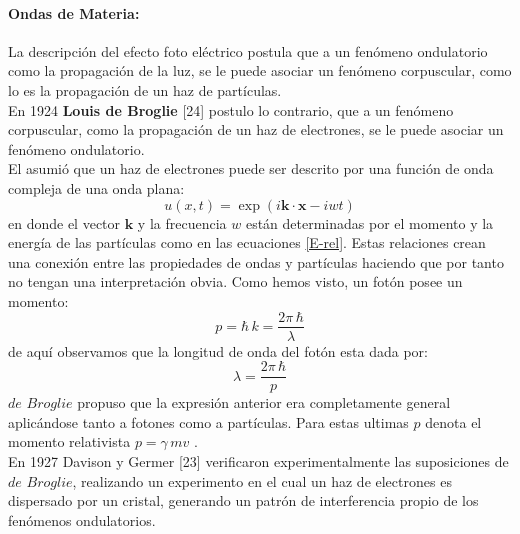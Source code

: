 \documentclass[12pt]{book}
\numberwithin{equation}{chapter}
\def\x{\mathbf{x}}
\def\k{\mathbf{k}}
\begin{document}
\paragraph{Ondas de Materia:}
La descripci\'on del efecto foto el\'ectrico postula que a un fen\'omeno ondulatorio como la propagaci\'on de la luz, se le puede asociar un fen\'omeno corpuscular, como lo es la propagaci\'on de un haz de part\'iculas.\\
En 1924 {\bf Louis de Broglie} [24] postulo lo contrario, que a un fen\'omeno corpuscular, como la propagaci\'on de un haz de electrones, se le puede asociar un fen\'omeno ondulatorio. \\
El asumi\'o que un haz de electrones puede ser descrito por una funci\'on de onda compleja de una onda plana:
\begin{equation}\label{utx}
u(x,t)= \exp ( i \k \cdot \x - iwt)
\end{equation}
en donde el vector $\k$ y la frecuencia $w$ est\'an determinadas por el momento y la energ\'ia de las part\'iculas como en las ecuaciones \eqref{E-rel}. Estas relaciones crean una conexi\'on entre las propiedades de ondas y part\'iculas haciendo que por tanto no tengan una interpretaci\'on obvia. Como hemos visto, un fot\'on posee un momento:
$$ p= \hbar \, k = \frac{2\pi\,\hbar}{\lambda} $$
de aqu\'i observamos que la longitud de onda del fot\'on esta dada por:
$$ \lambda = \frac{2 \pi \, \hbar}{p} $$
$de$ $Broglie$ propuso que la expresi\'on anterior era completamente general aplic\'andose tanto a fotones como a part\'iculas. Para estas ultimas $p$ denota el momento relativista $p=\gamma \, m v$ .\\ 

En 1927 Davison y Germer [23] verificaron experimentalmente las suposiciones de $de$ $Broglie$, realizando un experimento en el cual un haz de electrones es dispersado por un cristal, generando un patr\'on de interferencia propio de los fen\'omenos ondulatorios.
\end{document}
